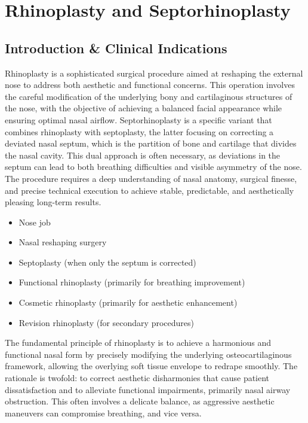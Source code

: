 \chapter{Rhinoplasty and Septorhinoplasty}

\section*{Introduction \& Clinical Indications}
Rhinoplasty is a sophisticated surgical procedure aimed at reshaping the external nose to address both aesthetic and functional concerns. This operation involves the careful modification of the underlying bony and cartilaginous structures of the nose, with the objective of achieving a balanced facial appearance while ensuring optimal nasal airflow. Septorhinoplasty is a specific variant that combines rhinoplasty with septoplasty, the latter focusing on correcting a deviated nasal septum, which is the partition of bone and cartilage that divides the nasal cavity. This dual approach is often necessary, as deviations in the septum can lead to both breathing difficulties and visible asymmetry of the nose. The procedure requires a deep understanding of nasal anatomy, surgical finesse, and precise technical execution to achieve stable, predictable, and aesthetically pleasing long-term results.

\begin{itemize}
  \item Nose job
  \item Nasal reshaping surgery
  \item Septoplasty (when only the septum is corrected)
  \item Functional rhinoplasty (primarily for breathing improvement)
  \item Cosmetic rhinoplasty (primarily for aesthetic enhancement)
  \item Revision rhinoplasty (for secondary procedures)
\end{itemize}

The fundamental principle of rhinoplasty is to achieve a harmonious and functional nasal form by precisely modifying the underlying osteocartilaginous framework, allowing the overlying soft tissue envelope to redrape smoothly. The rationale is twofold: to correct aesthetic disharmonies that cause patient dissatisfaction and to alleviate functional impairments, primarily nasal airway obstruction. This often involves a delicate balance, as aggressive aesthetic maneuvers can compromise breathing, and vice versa.

